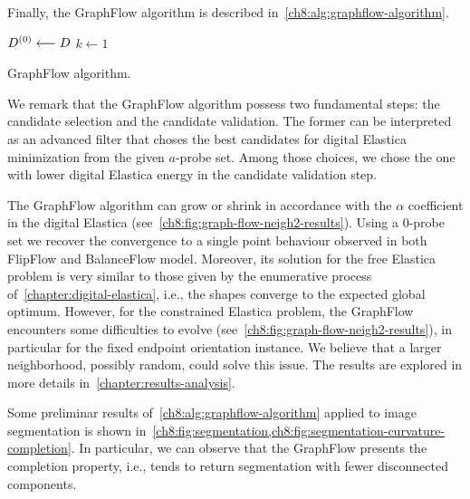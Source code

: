Finally, the GraphFlow algorithm is described in~\cref{ch8:alg:graphflow-algorithm}.


\begin{algorithm}
 
 \BlankLine
 $D^{(0)} \longleftarrow D$\;
 $k \longleftarrow 1$\;
 \caption{GraphFlow algorithm.}
 \label{ch8:alg:graphflow-algorithm}  
\end{algorithm}

We remark that the GraphFlow algorithm possess two fundamental steps: the candidate selection and the candidate validation. The former can be interpreted as an advanced filter that choses the best candidates for digital Elastica minimization from the given $a$-probe set. Among those choices, we chose the one with lower digital Elastica energy in the candidate validation step.

The GraphFlow algorithm can grow or shrink in accordance with the $\alpha$ coefficient in the digital Elastica (see~\cref{ch8:fig:graph-flow-neigh2-results}). Using a $0$-probe set we recover the convergence to a single point behaviour observed in both FlipFlow and BalanceFlow model. Moreover, its solution for the free Elastica problem is very similar to those given by the enumerative process of~\cref{chapter:digital-elastica}, i.e., the shapes converge to the expected global optimum. However, for the constrained Elastica problem, the GraphFlow encounters some difficulties to evolve (see~\cref{ch8:fig:graph-flow-neigh2-results}), in particular for the fixed endpoint orientation instance. We believe that a larger neighborhood, possibly random, could solve this issue. The results are explored in more details in~\cref{chapter:results-analysis}.

Some preliminar results of~\cref{ch8:alg:graphflow-algorithm} applied to image segmentation is shown in~\cref{ch8:fig:segmentation,ch8:fig:segmentation-curvature-completion}. In particular, we can observe that the GraphFlow presents the completion property, i.e., tends to return segmentation with fewer disconnected components.

